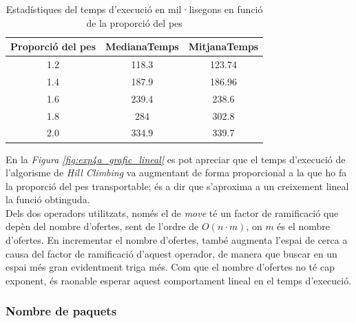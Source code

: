 \documentclass[a4paper]{article}
\begin{document}
	\begin{table}[H]
		\centering
		\begin{tabular}{|c|c|c|}
			\hline
			\textbf{Proporció del pes} & \textbf{MedianaTemps} & \textbf{MitjanaTemps} \\
			\hline
			1.2 & 118.3 & 123.74\\
			\hline
			1.4 & 187.9 & 186.96\\
			\hline
			1.6 & 239.4 & 238.6\\
			\hline
			1.8 & 284 & 302.8\\
			\hline
			2.0 & 334.9 & 339.7\\
			\hline
		\end{tabular}
		\caption{Estadístiques del temps d'execució en mil·lisegons en funció de la proporció del pes}
		\label{tab:exp4a_taula}
	\end{table}
	
	En la \textit{Figura \ref{fig:exp4a_grafic_lineal}} es pot apreciar que el temps d'execució de l'algorisme de \textit{Hill Climbing} va augmentant de forma proporcional a la que ho fa la proporció del pes transportable; és a dir que s'aproxima a un creixement lineal la funció obtinguda. \\
	
	Dels dos operadors utilitzats, només el de \textit{move} té un factor de ramificació que depèn del nombre d'ofertes, sent de l'ordre de $O(n \cdot m)$, on $m$ és el nombre d'ofertes. En incrementar el nombre d'ofertes, també augmenta l'espai de cerca a causa del factor de ramificació d'aquest operador, de manera que buscar en un espai més gran evidentment triga més. Com que el nombre d'ofertes no té cap exponent, és raonable esperar aquest comportament lineal en el temps d'execució.
	
	\subsubsection{Nombre de paquets}
	\label{sec:exp4b_nombrePaq}
	
\end{document}
